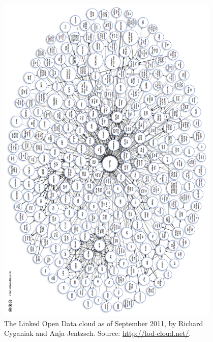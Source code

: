 \begin{figure}[htbp!]
\begin{center}
  \includegraphics[width=0.95\textwidth]{lod-cloud.png}    
  \caption[The Linked Open Data cloud as of September 2010.]
  {The Linked Open Data cloud as of September 2011, by Richard
   Cyganiak and Anja Jentzsch.
   Source: \url{http://lod-cloud.net/}.}    
  \label{fig:lod-cloud}
  \end{center}  
\end{figure}

